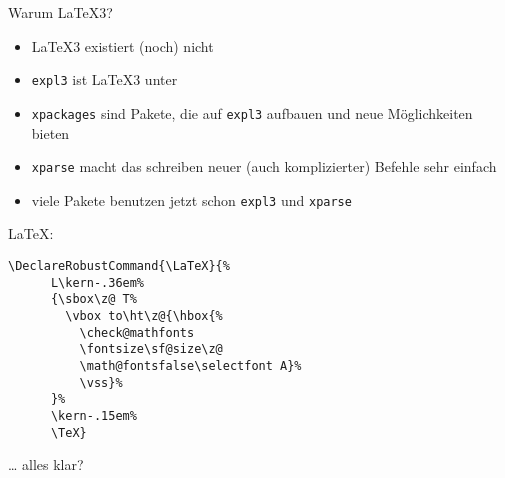 \begin{frame}[t]
  \centering
\end{frame}

\begin{frame}{Warum \LaTeX3?}
  \begin{itemize}
    \item \LaTeX3 existiert (noch) nicht
    \item \texttt{expl3} ist \LaTeX3 unter \LaTeXe
    \item \texttt{xpackages} sind Pakete, die auf \texttt{expl3} aufbauen und neue Möglichkeiten bieten
    \item \texttt{xparse} macht das schreiben neuer (auch komplizierter) Befehle sehr einfach
    \item viele Pakete benutzen jetzt schon \texttt{expl3} und \texttt{xparse}
  \end{itemize}
\end{frame}

\begin{frame}[fragile]
  \centering
  {\Huge \LaTeX:}

  \vspace{10pt}
  \centering
  \begin{BVerbatim}[gobble=4]
    \DeclareRobustCommand{\LaTeX}{%
      L\kern-.36em%
      {\sbox\z@ T%
        \vbox to\ht\z@{\hbox{%
          \check@mathfonts
          \fontsize\sf@size\z@
          \math@fontsfalse\selectfont A}%
          \vss}%
      }%
      \kern-.15em%
      \TeX}
  \end{BVerbatim}

  \begin{center}
    \Huge
    … alles klar?
  \end{center}
\end{frame}
